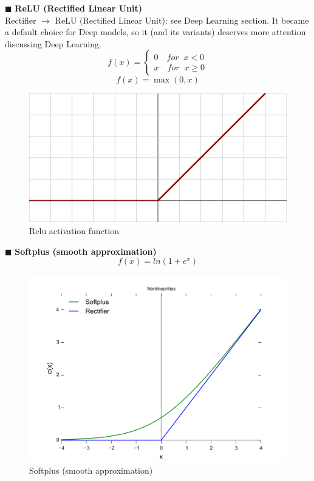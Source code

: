 \documentclass[../main.tex]{subfiles}
\begin{document}
\noindent$\blacksquare$ \textbf{ReLU (Rectified Linear Unit)}\\
Rectifier $\rightarrow$ ReLU (Rectified Linear Unit): see Deep Learning section. It became a default choice for Deep models, so it (and its variants) deserves more attention discussing Deep Learning.
\[
    f(x) = \left\{
                \begin{array}{ll}
                  0 \quad for \;\; x<0\\
                  x \quad for \;\; x \geq 0
                \end{array}
              \right.
\]
$$ f(x) = \max(0,x) $$
\begin{figure}[H]
    \centering
    \includegraphics[scale = 0.15]{lectures/4_neural_networks/4_relu.png}
    \caption{Relu activation function}
    \label{fig:4_relu}
\end{figure}
\noindent$\blacksquare$ \textbf{Softplus (smooth approximation)}\\
$$ f(x) = ln(1 + e^x)$$
\begin{figure}[H]
    \centering
    \includegraphics[scale = 0.22]{lectures/4_neural_networks/4_softplus.png}
    \caption{Softplus (smooth approximation)}
    \label{fig:4_softplus}
\end{figure}
\end{document}

